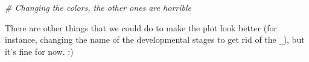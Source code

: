 \documentclass[
]{article}
\newenvironment{Shaded}{\begin{snugshade}}{\end{snugshade}}
\newcommand{\CommentTok}[1]{\textcolor[rgb]{0.56,0.35,0.01}{\textit{#1}}}
\begin{document}
\begin{Shaded}
\begin{Highlighting}[]
\CommentTok{\# Changing the colors, the other ones are horrible}
\end{Highlighting}
\end{Shaded}

There are other things that we could do to make the plot look better
(for instance, changing the name of the developmental stages to get rid
of the \texttt{\_}), but it's fine for now. :)
\end{document}
